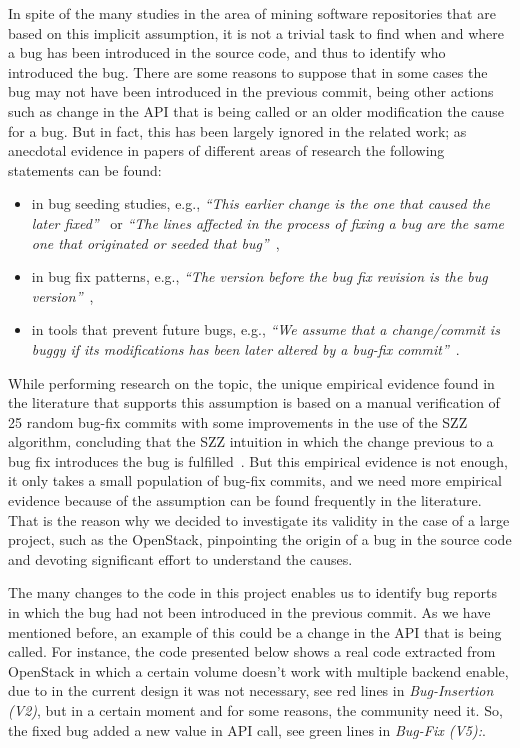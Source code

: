 \documentclass[ifip]{svmult}
\begin{document}
In spite of the many studies in the area of mining software repositories that are based on this implicit assumption, it is not a trivial task to find when and where a bug has been introduced in the source code, and thus to identify who introduced the bug. There are some reasons to suppose that in some cases the bug may not have been introduced in the previous commit, being other actions such as change in the API that is being called or an older modification the cause for a bug. But in fact, this has been largely ignored in the related work; as anecdotal evidence in papers of different areas of research the following statements can be found: 

\begin{itemize}
  \item in bug seeding studies, e.g., \textit{``This earlier change is the one that caused the later fixed''}~\cite{williams2008szz} or \textit{``The lines affected in the process of fixing a bug are the same one that originated or seeded that bug''}~\cite{izquierdo2011developers},
  \item in bug fix patterns, e.g., \textit{``The version before the bug fix revision is the bug version''}~\cite{pan2009toward},
  \item in tools that prevent future bugs, e.g., \textit{``We assume that a change/commit is buggy if its modifications has been later altered by a bug-fix commit''}~\cite{fejzer2015supporting}. 
\end{itemize}

While performing research on the topic, the unique empirical evidence found in the literature that supports this assumption is based on a manual verification of 25 random bug-fix commits with some improvements in the use of the SZZ algorithm, concluding that the SZZ intuition in which the change previous to a bug fix introduces the bug is fulfilled~\cite{williams2008szz}. But this empirical evidence is not enough, it only takes a small population of bug-fix commits, and we need more empirical evidence because of the assumption can be found frequently in the literature. That is the reason why we decided to investigate its validity in the case of a large project, such as the OpenStack, pinpointing the origin of a bug in the source code and devoting significant effort to understand the causes. 

The many changes to the code in this project enables us to identify bug reports in which the bug had not been introduced in the previous commit. As we have mentioned before, an example of this could be a change in the API that is being called. For instance, the code presented below shows a real code extracted from OpenStack in which a certain volume doesn't work with multiple backend enable, due to in the current design it was not necessary, see red lines in \textit{Bug-Insertion (V2)}, but in a certain moment and for some reasons, the community need it. So, the fixed bug added a new value in API call, see green lines in \textit{Bug-Fix (V5):}. 
\end{document}
